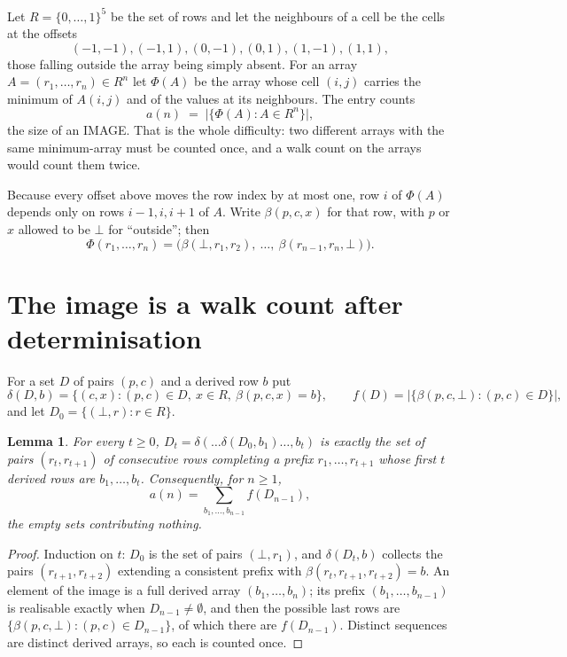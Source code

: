 \documentclass[11pt,a4paper]{article}
\theoremstyle{plain}
\newtheorem{lemma}[theorem]{Lemma}
\theoremstyle{definition}
\begin{document}
Let $R=\{0,\dots,1\}^{5}$ be the set of rows and let the neighbours of
a cell be the cells at the offsets
\[
(-1,-1), (-1,1), (0,-1), (0,1), (1,-1), (1,1),
\]
those falling outside the array being simply absent. For an array
$A=(r_1,\dots,r_n)\in R^n$ let $\Phi(A)$ be the array whose cell $(i,j)$ carries the
minimum of $A(i,j)$ and of the values at its neighbours. The entry counts
\[
a(n)\;=\;\bigl|\{\Phi(A):A\in R^n\}\bigr| ,
\]
the size of an IMAGE. That is the whole difficulty: two different arrays with the same
minimum-array must be counted once, and a walk count on the arrays would count them twice.

Because every offset above moves the row index by at most one, row $i$ of
$\Phi(A)$ depends only on rows $i-1,i,i+1$ of $A$. Write $\beta(p,c,x)$ for that row, with $p$
or $x$ allowed to be $\bot$ for ``outside''; then
\[
\Phi(r_1,\dots,r_n)=\bigl(\beta(\bot,r_1,r_2),\ \dots,\ \beta(r_{n-1},r_n,\bot)\bigr).
\]

\section{The image is a walk count after determinisation}

For a set $D$ of pairs $(p,c)$ and a derived row $b$ put
\[
\delta(D,b)=\{(c,x):(p,c)\in D,\ x\in R,\ \beta(p,c,x)=b\},\qquad
f(D)=\bigl|\{\beta(p,c,\bot):(p,c)\in D\}\bigr| ,
\]
and let $D_0=\{(\bot,r):r\in R\}$.

\begin{lemma}\label{lem:det}
For every $t\ge0$, $D_t=\delta(\dots\delta(D_0,b_1)\dots,b_t)$ is exactly the set of pairs
$(r_t,r_{t+1})$ of consecutive rows completing a prefix $r_1,\dots,r_{t+1}$ whose first $t$
derived rows are $b_1,\dots,b_t$. Consequently, for $n\ge1$,
\[
a(n)=\sum_{b_1,\dots,b_{n-1}}f(D_{n-1}),
\]
the empty sets contributing nothing.
\end{lemma}

\begin{proof}
Induction on $t$: $D_0$ is the set of pairs $(\bot,r_1)$, and $\delta(D_t,b)$ collects the
pairs $(r_{t+1},r_{t+2})$ extending a consistent prefix with
$\beta(r_t,r_{t+1},r_{t+2})=b$. An element of the image is a full derived array
$(b_1,\dots,b_n)$; its prefix $(b_1,\dots,b_{n-1})$ is realisable exactly when
$D_{n-1}\neq\emptyset$, and then the possible last rows are
$\{\beta(p,c,\bot):(p,c)\in D_{n-1}\}$, of which there are $f(D_{n-1})$. Distinct sequences
are distinct derived arrays, so each is counted once.
\end{proof}
\end{document}
